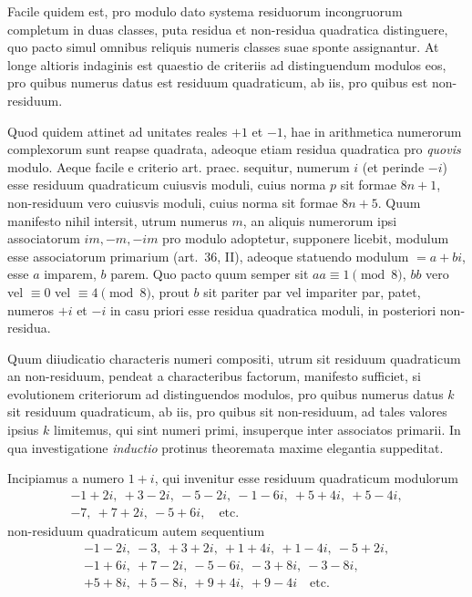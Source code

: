 Facile quidem est, pro modulo dato systema residuorum incongruorum completum in duas classes, puta residua et non-residua quadratica distinguere, quo pacto simul omnibus reliquis numeris classes suae sponte assignantur. At longe altioris indaginis est quaestio de criteriis ad distinguendum modulos eos, pro quibus numerus datus est residuum quadraticum, ab iis, pro quibus est non-residuum.

Quod quidem attinet ad unitates reales $+1$ et $-1$, hae in arithmetica numerorum complexorum sunt reapse quadrata, adeoque etiam residua quadratica pro \emph{quovis} modulo. Aeque facile e criterio art. praec. sequitur, numerum $i$ (et perinde $-i$) esse residuum quadraticum cuiusvis moduli, cuius norma $p$ sit formae $8n+1$, non-residuum vero cuiusvis moduli, cuius norma sit formae $8n+5$. Quum manifesto nihil intersit, utrum numerus $m$, an aliquis numerorum ipsi associatorum $im,-m,-im$ pro modulo adoptetur, supponere licebit, modulum esse associatorum primarium (art.~36, II), adeoque statuendo modulum $=a+bi$, esse $a$ imparem, $b$ parem. Quo pacto quum semper sit $aa\equiv1\pmod8$, $bb$ vero vel $\equiv0$ vel $\equiv4\pmod8$, prout $b$ sit pariter par vel impariter par, patet, numeros $+i$ et $-i$ in casu priori esse residua quadratica moduli, in posteriori non-residua.

%
Quum diiudicatio characteris numeri compositi, utrum sit residuum quadraticum an non-residuum, pendeat a characteribus factorum, manifesto sufficiet, si evolutionem criteriorum ad distinguendos modulos, pro quibus numerus datus $k$ sit residuum quadraticum, ab iis, pro quibus sit non-residuum, ad tales valores ipsius $k$ limitemus, qui sint numeri primi, insuperque inter associatos primarii. In qua investigatione \emph{inductio} protinus theoremata maxime elegantia suppeditat.

Incipiamus a numero $1+i$, qui invenitur esse residuum quadraticum modulorum
\[
\begin{gathered}
-1+2i,\ +3-2i,\ -5-2i,\ -1-6i,\ +5+4i,\ +5-4i,\\
-7,\ +7+2i,\ -5+6i,\quad\text{etc.}
\end{gathered}
\]
non-residuum quadraticum autem sequentium
\[
\begin{gathered}
-1-2i,\ -3,\ +3+2i,\ +1+4i,\ +1-4i,\ -5+2i,\\
-1+6i,\ +7-2i,\ -5-6i,\ -3+8i,\ -3-8i,\\
+5+8i,\ +5-8i,\ +9+4i,\ +9-4i\quad\text{etc.}
\end{gathered}
\]

